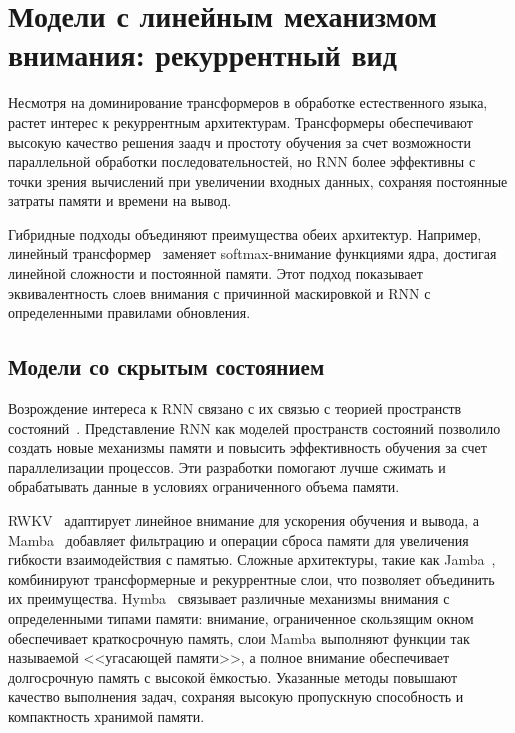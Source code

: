 \section{Модели с линейным механизмом внимания: рекуррентный вид}
\label{sec:attention-recurrent}

Несмотря на доминирование трансформеров в обработке естественного языка, растет интерес к рекуррентным архитектурам. Трансформеры обеспечивают высокую качество решения заадч и простоту обучения за счет возможности параллельной обработки последовательностей, но RNN более эффективны с точки зрения вычислений при увеличении входных данных, сохраняя постоянные затраты памяти и времени на вывод.

Гибридные подходы объединяют преимущества обеих архитектур. Например, линейный трансформер~\cite{katharopoulos2020transformers} заменяет softmax-внимание функциями ядра, достигая линейной сложности и постоянной памяти. Этот подход показывает эквивалентность слоев внимания с причинной маскировкой и RNN с определенными правилами обновления.

\subsection{Модели со скрытым состоянием}

Возрождение интереса к RNN связано с их связью с теорией пространств состояний~\cite{gu2020hippo, gu2021combining, gu2021s4}. Представление RNN как моделей пространств состояний позволило создать новые механизмы памяти и повысить эффективность обучения за счет параллелизации процессов. Эти разработки помогают лучше сжимать и обрабатывать данные в условиях ограниченного объема памяти.

RWKV~\cite{peng2023rwkv} адаптирует линейное внимание для ускорения обучения и вывода, а Mamba~\cite{gu2023mamba} добавляет фильтрацию и операции сброса памяти для увеличения гибкости взаимодействия с памятью. Сложные архитектуры, такие как Jamba~\cite{lieber2024jamba}, комбинируют трансформерные и рекуррентные слои, что позволяет объединить их преимущества. Hymba~\cite{dong2024hymba} связывает различные механизмы внимания с определенными типами памяти: внимание, ограниченное скользящим окном обеспечивает краткосрочную память, слои Mamba выполняют функции так называемой <<угасающей памяти>>, а полное внимание обеспечивает долгосрочную память с высокой ёмкостью. Указанные методы повышают качество выполнения задач, сохраняя высокую пропускную способность и компактность хранимой памяти.

